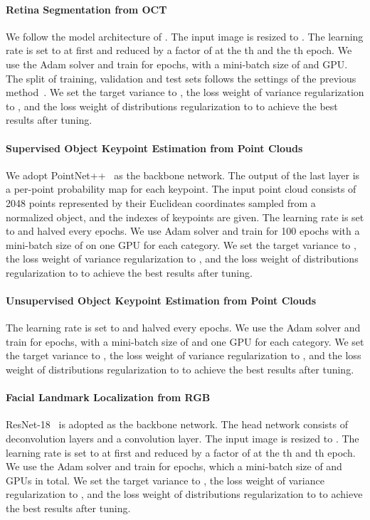 \documentclass{article}
\begin{document}
\paragraph{Retina Segmentation from OCT}
We follow the model architecture of \cite{he2019fully}. The input image is resized to . The learning rate is set to  at first and reduced by a factor of  at the th and the th epoch. We use the Adam solver and train for  epochs, with a mini-batch size of  and  GPU. The split of training, validation and test sets follows the settings of the previous method~\cite{he2019fully}. We set the target variance  to , the loss weight of variance regularization to , and the loss weight of distributions regularization to  to achieve the best results after tuning.


\paragraph{Supervised Object Keypoint Estimation from Point Clouds}
We adopt PointNet++~\cite{qi2017pointnetplusplus} as the backbone network. The output of the last layer is a per-point probability map for each keypoint. The input point cloud consists of 2048 points represented by their Euclidean coordinates sampled from a normalized object, and the indexes of keypoints are given. The learning rate is set to  and halved every  epochs. We use Adam solver and train for 100 epochs with a mini-batch size of  on one GPU for each category. We set the target variance  to , the loss weight of variance regularization to , and the loss weight of distributions regularization to  to achieve the best results after tuning.


\paragraph{Unsupervised Object Keypoint Estimation from Point Clouds}
The learning rate is set to  and halved every  epochs. We use the Adam solver and train for  epochs, with a mini-batch size of  and one GPU for each category. We set the target variance  to , the loss weight of variance regularization to , and the loss weight of distributions regularization to  to achieve the best results after tuning.

\paragraph{Facial Landmark Localization from RGB}
ResNet-18~\cite{resnet} is adopted as the backbone network. The head network consists of  deconvolution layers and a  convolution layer. The input image is resized to . The learning rate is set to  at first and reduced by a factor of  at the th and th epoch. We use the Adam solver and train for  epochs, which a mini-batch size of  and  GPUs in total. We set the target variance  to , the loss weight of variance regularization to , and the loss weight of distributions regularization to  to achieve the best results after tuning.
 
\end{document}
